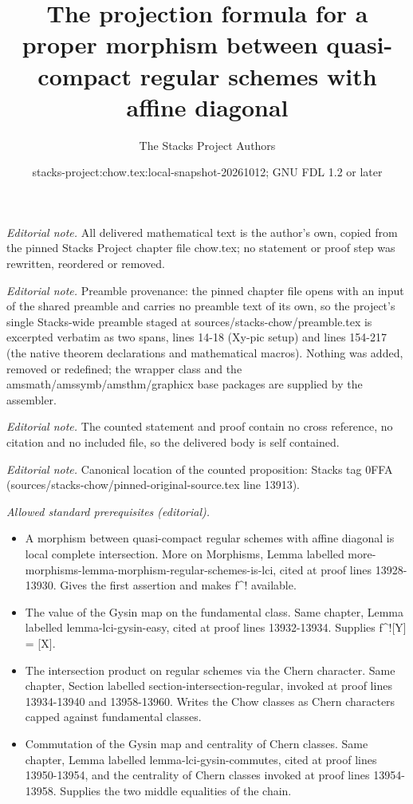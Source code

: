 \documentclass[10pt,a4paper]{amsart}
\title{The projection formula for a proper morphism between quasi-compact regular schemes with affine diagonal}
\author{The Stacks Project Authors}
\date{stacks-project:chow.tex:local-snapshot-20261012; GNU FDL 1.2 or later}
\theoremstyle{plain}
\theoremstyle{definition}
\theoremstyle{remark}
\numberwithin{equation}{subsection}
\begin{document}
\maketitle
\noindent\textit{Editorial note.} All delivered mathematical text is the author's own, copied from the pinned Stacks Project chapter file chow.tex; no statement or proof step was rewritten, reordered or removed.\par\medskip
\noindent\textit{Editorial note.} Preamble provenance: the pinned chapter file opens with an input of the shared preamble and carries no preamble text of its own, so the project's single Stacks-wide preamble staged at sources/stacks-chow/preamble.tex is excerpted verbatim as two spans, lines 14-18 (Xy-pic setup) and lines 154-217 (the native theorem declarations and mathematical macros). Nothing was added, removed or redefined; the wrapper class and the amsmath/amssymb/amsthm/graphicx base packages are supplied by the assembler.\par\medskip
\noindent\textit{Editorial note.} The counted statement and proof contain no cross reference, no citation and no included file, so the delivered body is self contained.\par\medskip
\noindent\textit{Editorial note.} Canonical location of the counted proposition: Stacks tag 0FFA (sources/stacks-chow/pinned-original-source.tex line 13913).\par\medskip
\noindent\textit{Allowed standard prerequisites (editorial).}\begin{itemize}
\item A morphism between quasi-compact regular schemes with affine diagonal is local complete intersection. More on Morphisms, Lemma labelled more-morphisms-lemma-morphism-regular-schemes-is-lci, cited at proof lines 13928-13930. Gives the first assertion and makes f\textasciicircum{}! available.
\item The value of the Gysin map on the fundamental class. Same chapter, Lemma labelled lemma-lci-gysin-easy, cited at proof lines 13932-13934. Supplies f\textasciicircum{}![Y] = [X].
\item The intersection product on regular schemes via the Chern character. Same chapter, Section labelled section-intersection-regular, invoked at proof lines 13934-13940 and 13958-13960. Writes the Chow classes as Chern characters capped against fundamental classes.
\item Commutation of the Gysin map and centrality of Chern classes. Same chapter, Lemma labelled lemma-lci-gysin-commutes, cited at proof lines 13950-13954, and the centrality of Chern classes invoked at proof lines 13954-13958. Supplies the two middle equalities of the chain.
\end{itemize}\medskip
\end{document}
